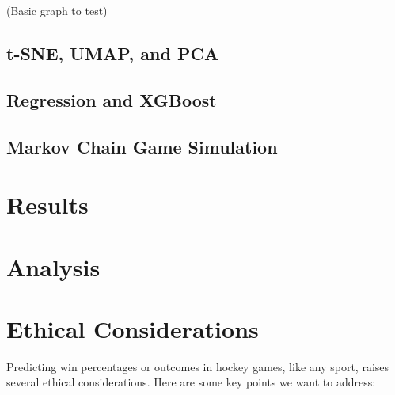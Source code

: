 \documentclass[11pt]{article}
\begin{document}
(Basic graph to test)

\begin{center}
\end{center}

\subsection{t-SNE, UMAP, and PCA}

\subsection{Regression and XGBoost}

\subsection{Markov Chain Game Simulation}

\section{Results}

\section{Analysis}

\section{Ethical Considerations}
Predicting win percentages or outcomes in hockey games, like any sport, raises several ethical considerations. Here are some key points we want to address:
\end{document}
